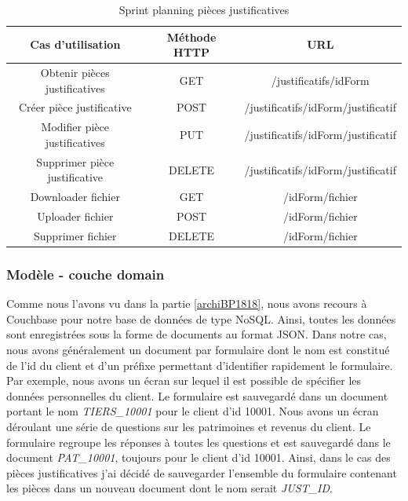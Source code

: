 \begin{table}[h!]
	\center
	\begin{tabular}{| c | c | c |}
     \hline
     Cas d'utilisation & Méthode HTTP & URL \\ \hline
     Obtenir pièces justificatives & GET & /justificatifs/{idForm}\\ \hline
     Créer pièce justificative & POST & /justificatifs/{idForm}/justificatif\\ \hline
     Modifier pièce justificatives & PUT & /justificatifs/{idForm}/justificatif\\ \hline
     Supprimer pièce justificative & DELETE & /justificatifs/{idForm}/justificatif\\ \hline
     Downloader fichier & GET & /{idForm}/fichier\\ \hline
     Uploader fichier & POST & /{idForm}/fichier\\ \hline
     Supprimer fichier & DELETE & /{idForm}/fichier\\ \hline
	\end{tabular}
	\caption{Sprint planning pièces justificatives}
	\label{sprintPlanningPJ}
\end{table}

	\subsubsection{Modèle - couche domain}
	
	Comme nous l'avons vu dans la partie \ref{archiBP1818}, nous avons recours à Couchbase pour notre base de données de type NoSQL. Ainsi, toutes les données sont enregistrées sous la forme de documents au format JSON. Dans notre cas, nous avons généralement un document par formulaire dont le nom est constitué de l'id du client et d'un préfixe permettant d'identifier rapidement le formulaire. Par exemple, nous avons un écran sur lequel il est possible de spécifier les données personnelles du client. Le formulaire est sauvegardé dans un document portant le nom \textit{TIERS\_10001} pour le client d'id 10001. Nous avons un écran déroulant une série de questions sur les patrimoines et revenus du client. Le formulaire regroupe les réponses à toutes les questions et est sauvegardé dans le document \textit{PAT\_10001}, toujours pour le client d'id 10001. Ainsi, dans le cas des pièces justificatives j'ai décidé de sauvegarder l'ensemble du formulaire contenant les pièces dans un nouveau document dont le nom serait \textit{JUST\_ID}. \\
	
